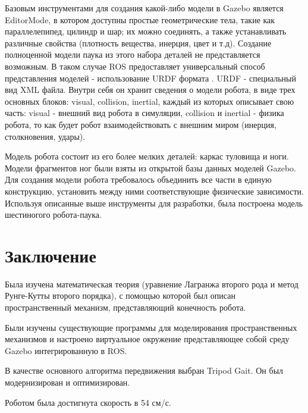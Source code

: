 \documentclass{article}
\begin{document}
Базовым инструментами для создания какой-либо модели в Gazebo является EditorMode, в котором доступны простые геометрические тела, такие как параллелепипед, цилиндр и шар; их можно соединять, а также устанавливать различные свойства (плотность вещества, инерция, цвет и т.д). Создание полноценной модели паука из этого набора деталей не представляется возможным. В таком случае ROS предоставляет универсальный способ представления моделей - использование URDF формата \cite{ref6}. URDF - специальный вид XML файла. Внутри себя он хранит сведения о модели робота, в виде трех основных блоков: visual, collision, inertial, каждый из которых описывает свою часть: visual - внешний вид робота в симуляции, collision и inertial - физика робота, то как будет робот взаимодействовать с внешним миром (инерция, столкновения, удары).

Модель робота состоит из его более мелких деталей: каркас туловища и ноги. Модели фрагментов ног были взяты из открытой базы данных моделей Gazebo. Для создания модели робота требовалось объединить все части в единую конструкцию, установить между ними соответствующие физические зависимости. Используя описанные выше инструменты для разработки, была построена модель шестиногого робота-паука.

\section{Заключение}
Была изучена математическая теория (уравнение Лагранжа второго рода и метод Рунге-Кутты второго порядка), с помощью которой был описан пространственный механизм, представляющий конечность робота.

Были изучены существующие программы для моделирования пространственных механизмов и настроено виртуальное окружение представляющее собой среду Gazebo интегрированную в ROS.

В качестве основного алгоритма передвижения выбран Tripod Gait. Он был модернизирован и оптимизирован. 

Роботом была достигнута скорость в 54 см/с.
\end{document}

